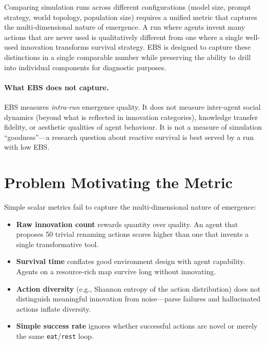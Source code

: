 \documentclass[a4paper, 11pt]{article}
\begin{document}
Comparing simulation runs across different configurations (model size, prompt strategy, world topology, population size) requires a unified metric that captures the multi-dimensional nature of emergence. A run where agents invent many actions that are never used is qualitatively different from one where a single well-used innovation transforms survival strategy. EBS is designed to capture these distinctions in a single comparable number while preserving the ability to drill into individual components for diagnostic purposes.

\paragraph{What EBS does not capture.}
EBS measures \emph{intra-run} emergence quality. It does not measure inter-agent social dynamics (beyond what is reflected in innovation categories), knowledge transfer fidelity, or aesthetic qualities of agent behaviour. It is not a measure of simulation ``goodness''---a research question about reactive survival is best served by a run with low EBS.

\section{Problem Motivating the Metric}

Simple scalar metrics fail to capture the multi-dimensional nature of emergence:

\begin{itemize}[nosep]
    \item \textbf{Raw innovation count} rewards quantity over quality. An agent that proposes 50 trivial renaming actions scores higher than one that invents a single transformative tool.
    \item \textbf{Survival time} conflates good environment design with agent capability. Agents on a resource-rich map survive long without innovating.
    \item \textbf{Action diversity} (e.g., Shannon entropy of the action distribution) does not distinguish meaningful innovation from noise---parse failures and hallucinated actions inflate diversity.
    \item \textbf{Simple success rate} ignores whether successful actions are novel or merely the same \texttt{eat}/\texttt{rest} loop.
\end{itemize}
\end{document}
